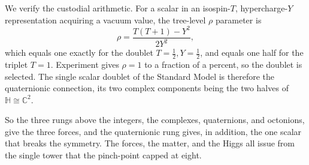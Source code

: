 We verify the custodial arithmetic. For a scalar in an isospin-$T$, hypercharge-$Y$ representation acquiring a vacuum
value, the tree-level $\rho$ parameter is
\begin{equation}
  \rho = \frac{T(T+1) - Y^2}{2 Y^2},
\end{equation}
which equals one exactly for the doublet $T = \tfrac12, Y = \tfrac12$, and equals one half for the triplet $T = 1$.
Experiment gives $\rho = 1$ to a fraction of a percent, so the doublet is selected. The single scalar doublet of the
Standard Model is therefore the quaternionic connection, its two complex components being the two halves of
$\mathbb{H} \cong \mathbb{C}^2$.

So the three rungs above the integers, the complexes, quaternions, and octonions, give the three forces, and the
quaternionic rung gives, in addition, the one scalar that breaks the symmetry. The forces, the matter, and the Higgs
all issue from the single tower that the pinch-point capped at eight.
